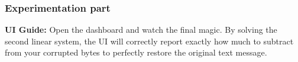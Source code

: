 \subsubsection*{Experimentation part}
\textbf{UI Guide:} Open the dashboard and watch the final magic. By solving the second linear system, the UI will correctly report exactly how much to subtract from your corrupted bytes to perfectly restore the original text message.

\vspace{1cm}
